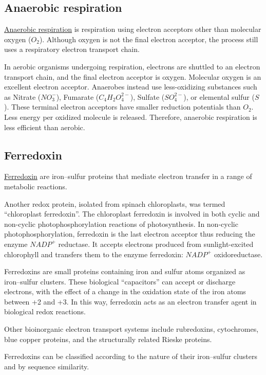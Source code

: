 \documentclass[a4paper,14pt]{extarticle}
\begin{document}
\subsection{Anaerobic respiration}
\href{https://en.wikipedia.org/wiki/Anaerobic_respiration}{Anaerobic respiration} is
respiration using electron acceptors other than molecular oxygen ($O_2$). Although oxygen
is not the final electron acceptor, the process still uses a respiratory electron
transport chain.

In aerobic organisms undergoing respiration, electrons are shuttled to an electron
transport chain, and the final electron acceptor is oxygen. Molecular oxygen is an
excellent electron acceptor. Anaerobes instead use less-oxidizing substances such as
Nitrate ($NO_3^-$), Fumarate ($C_4H_2O_4^{2-}$), Sulfate ($SO_4^{2-}$), or elemental
sulfur ($S$). These terminal electron acceptors have smaller reduction potentials than
$O_2$.  Less energy per oxidized molecule is released. Therefore, anaerobic respiration is
less efficient than aerobic.

\subsection{Ferredoxin}
\href{https://en.wikipedia.org/wiki/Ferredoxin}{Ferredoxin}
are iron–sulfur proteins that mediate electron transfer in a range of metabolic reactions.

Another redox protein, isolated from spinach chloroplasts, was termed ``chloroplast
ferredoxin''. The chloroplast ferredoxin is involved in both cyclic and non-cyclic
photophosphorylation reactions of photosynthesis. In non-cyclic photophosphorylation,
ferredoxin is the last electron acceptor thus reducing the enzyme $\mathit{NADP^+}$
reductase. It accepts electrons produced from sunlight-excited chlorophyll and transfers
them to the enzyme ferredoxin: $\mathit{NADP^+}$ oxidoreductase.

Ferredoxins are small proteins containing iron and sulfur atoms organized as iron–sulfur
clusters. These biological ``capacitors'' can accept or discharge electrons, with the
effect of a change in the oxidation state of the iron atoms between +2 and +3. In this
way, ferredoxin acts as an electron transfer agent in biological redox reactions.

Other bioinorganic electron transport systems include rubredoxins, cytochromes, blue
copper proteins, and the structurally related Rieske proteins.

Ferredoxins can be classified according to the nature of their iron–sulfur clusters and by
sequence similarity.
\end{document}
